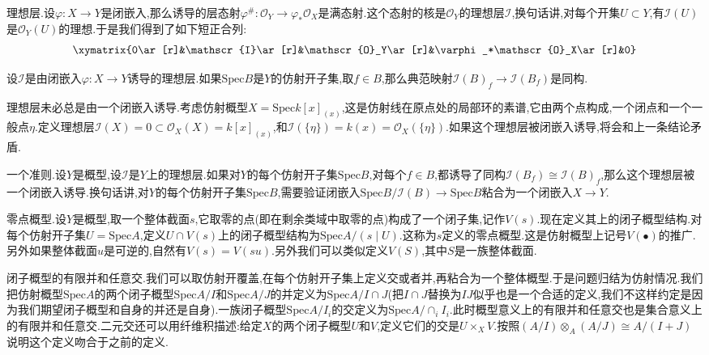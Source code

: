 \item 理想层.设$\varphi:X\to Y$是闭嵌入,那么诱导的层态射$\varphi^{\#}:\mathscr{O}_Y\to\varphi_*\mathscr{O}_X$是满态射.这个态射的核是$\mathscr{O}_Y$的理想层$\mathscr{I}$,换句话讲,对每个开集$U\subset Y$,有$\mathscr{I}(U)$是$\mathscr{O}_Y(U)$的理想.于是我们得到了如下短正合列:
$$\xymatrix{0\ar[r]&\mathscr{I}\ar[r]&\mathscr{O}_Y\ar[r]&\varphi_*\mathscr{O}_X\ar[r]&0}$$
\item 设$\mathscr{I}$是由闭嵌入$\varphi:X\to Y$诱导的理想层.如果$\mathrm{Spec}B$是$Y$的仿射开子集,取$f\in B$,那么典范映射$\mathscr{I}(B)_f\to\mathscr{I}(B_f)$是同构.
\item 理想层未必总是由一个闭嵌入诱导.考虑仿射概型$X=\mathrm{Spec}k[x]_{(x)}$,这是仿射线在原点处的局部环的素谱,它由两个点构成,一个闭点和一个一般点$\eta$.定义理想层$\mathscr{I}(X)={0}\subset\mathscr{O}_X(X)=k[x]_{(x)}$,和$\mathscr{I}(\{\eta\})=k(x)=\mathscr{O}_X(\{\eta\})$.如果这个理想层被闭嵌入诱导,将会和上一条结论矛盾.
\item 一个准则.设$Y$是概型,设$\mathscr{I}$是$Y$上的理想层.如果对$Y$的每个仿射开子集$\mathrm{Spec}B$,对每个$f\in B$,都诱导了同构$\mathscr{I}(B_f)\cong\mathscr{I}(B)_f$,那么这个理想层被一个闭嵌入诱导.换句话讲,对$Y$的每个仿射开子集$\mathrm{Spec}B$,需要验证闭嵌入$\mathrm{Spec}B/\mathscr{I}(B)\to\mathrm{Spec}B$粘合为一个闭嵌入$X\to Y$.
\item 零点概型.设$Y$是概型,取一个整体截面$s$,它取零的点(即在剩余类域中取零的点)构成了一个闭子集,记作$V(s)$.现在定义其上的闭子概型结构.对每个仿射开子集$U=\mathrm{Spec}A$,定义$U\cap V(s)$上的闭子概型结构为$\mathrm{Spec}A/(s\mid U)$.这称为$s$定义的零点概型.这是仿射概型上记号$V(\bullet)$的推广.另外如果整体截面$u$是可逆的,自然有$V(s)=V(su)$.另外我们可以类似定义$V(S)$,其中$S$是一族整体截面.
\item 闭子概型的有限并和任意交.我们可以取仿射开覆盖,在每个仿射开子集上定义交或者并,再粘合为一个整体概型.于是问题归结为仿射情况.我们把仿射概型$\mathrm{Spec}A$的两个闭子概型$\mathrm{Spec}A/I$和$\mathrm{Spec}A/J$的并定义为$\mathrm{Spec}A/I\cap J$(把$I\cap J$替换为$IJ$似乎也是一个合适的定义,我们不这样约定是因为我们期望闭子概型和自身的并还是自身).一族闭子概型$\mathrm{Spec}A/I_i$的交定义为$\mathrm{Spec}A/\cap_iI_i$.此时概型意义上的有限并和任意交也是集合意义上的有限并和任意交.二元交还可以用纤维积描述:给定$X$的两个闭子概型$U$和$V$,定义它们的交是$U\times_XV$.按照$(A/I)\otimes_A(A/J)\cong A/(I+J)$说明这个定义吻合于之前的定义.



